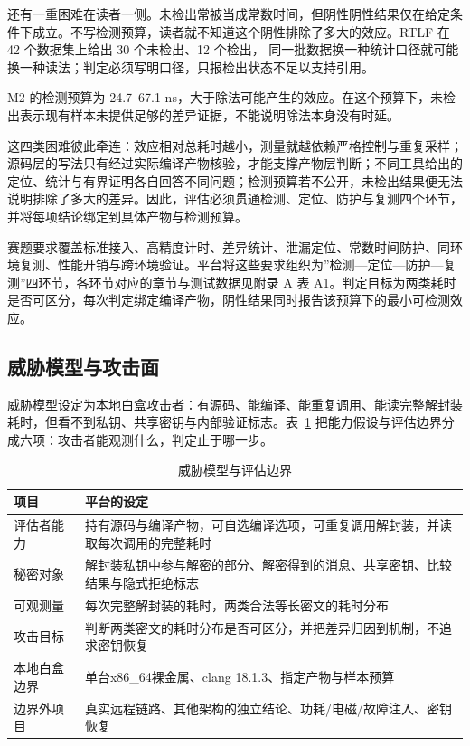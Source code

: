 还有一重困难在读者一侧。未检出常被当成常数时间，但阴性阴性结果仅在给定条件下成立。不写检测预算，读者就不知道这个阴性排除了多大的效应。RTLF 在 42 个数据集上给出 30 个未检出、12 个检出\cite{rtlf}，%
同一批数据换一种统计口径就可能换一种读法；判定必须写明口径，只报检出状态不足以支持引用。

M2 的检测预算为 24.7--67.1 ns，大于除法可能产生的效应。在这个预算下，未检出表示现有样本未提供足够的差异证据，不能说明除法本身没有时延。%

这四类困难彼此牵连：效应相对总耗时越小，测量就越依赖严格控制与重复采样；源码层的写法只有经过实际编译产物核验，才能支撑产物层判断；不同工具给出的定位、统计与有界证明各自回答不同问题；检测预算若不公开，未检出结果便无法说明排除了多大的差异。因此，评估必须贯通检测、定位、防护与复测四个环节，并将每项结论绑定到具体产物与检测预算。

赛题要求覆盖标准接入、高精度计时、差异统计、泄漏定位、常数时间防护、同环境复测、性能开销与跨环境验证。平台将这些要求组织为”检测—定位—防护—复测”四环节，各环节对应的章节与测试数据见附录 A 表 A1。判定目标为两类耗时是否可区分，每次判定绑定编译产物，阴性结果同时报告该预算下的最小可检测效应。

\subsection{威胁模型与攻击面}

威胁模型设定为本地白盒攻击者：有源码、能编译、能重复调用、能读完整解封装耗时，但看不到私钥、共享密钥与内部验证标志。表~\ref{tab:threat} 把能力假设与评估边界分成六项：攻击者能观测什么，判定止于哪一步。

\begin{table}[H]
\centering
\caption{威胁模型与评估边界}
\label{tab:threat}
{\small
\begin{tabularx}{\textwidth}{|>{\raggedright\arraybackslash}p{3.0cm}|>{\raggedright\arraybackslash}X|}
\hline
项目 & 平台的设定 \\
\hline
评估者能力 & 持有源码与编译产物，可自选编译选项，可重复调用解封装，并读取每次调用的完整耗时 \\
\hline
秘密对象 & 解封装私钥中参与解密的部分、解密得到的消息、共享密钥、比较结果与隐式拒绝标志 \\
\hline
可观测量 & 每次完整解封装的耗时，两类合法等长密文的耗时分布 \\
\hline
攻击目标 & 判断两类密文的耗时分布是否可区分，并把差异归因到机制，不追求密钥恢复 \\
\hline
本地白盒边界 & 单台x86\_64裸金属、clang 18.1.3、指定产物与样本预算 \\
\hline
边界外项目 & 真实远程链路、其他架构的独立结论、功耗/电磁/故障注入、密钥恢复 \\
\hline
\end{tabularx}
}
\end{table}

